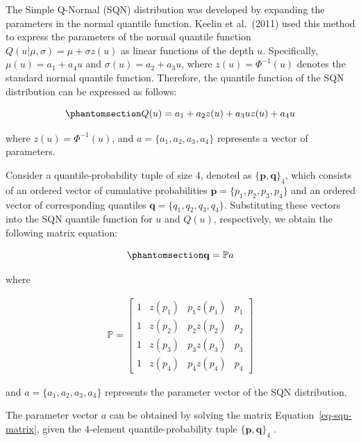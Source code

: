 \documentclass[
  fleqn,
  deca,
  blindrev
]{informs4}
\begin{document}
The Simple Q-Normal (SQN) distribution was developed by expanding the
parameters in the normal quantile function. Keelin et al.~(2011) used
this method to express the parameters of the normal quantile function
\(Q(u\vert\mu,\sigma)=\mu+\sigma z(u)\) as linear functions of the depth
\(u\). Specifically, \(\mu(u)=a_1+a_4u\) and \(\sigma(u)=a_2+a_3u\),
where \(z(u)=\Phi^{-1}(u)\) denotes the standard normal quantile
function. Therefore, the quantile function of the SQN distribution can
be expressed as follows:

\begin{equation}\phantomsection\label{eq-SQNQF}{
Q(u)= a_1+a_2z(u)+a_3uz(u)+a_4u\\
}\end{equation}

where \(z(u)=\Phi^{-1}(u)\), and \(a=\{a_1,a_2,a_3, a_4\}\) represents a
vector of parameters.

Consider a quantile-probability tuple of size 4, denoted as
\(\{\mathbf{p}, \mathbf{q}\}_4\), which consists of an ordered vector of
cumulative probabilities \(\mathbf{p}=\{p_1,p_2,p_3, p_4\}\) and an
ordered vector of corresponding quantiles
\(\mathbf{q}=\{q_1,q_2,q_3, q_4\}\). Substituting these vectors into the
SQN quantile function for \(u\) and \(Q(u)\), respectively, we obtain
the following matrix equation:

\begin{equation}\phantomsection\label{eq-sqn-matrix}{
\mathbf{q}=\mathbb Pa
}\end{equation}

where

\[
\begin{gathered}
\mathbb P=\begin{bmatrix} 1 & z(p_1) & p_1z(p_1) & p_1\\
                1 & z(p_2) & p_2z(p_2) & p_2\\
                1 & z(p_3) & p_3z(p_3) & p_3\\
                1 & z(p_4) & p_4z(p_4) & p_4\end{bmatrix}
\end{gathered}
\]

and \(a=\{a_1, a_2, a_3, a_4\}\) represents the parameter vector of the
SQN distribution.

The parameter vector \(a\) can be obtained by solving the matrix
Equation~\ref{eq-sqn-matrix}, given the 4-element quantile-probability
tuple \(\{\mathbf{p}, \mathbf{q}\}_4\)
\citep{keelin2011QuantileParameterizedDistributions, perepolkin2021HybridElicitationIndirect}.
\end{document}
